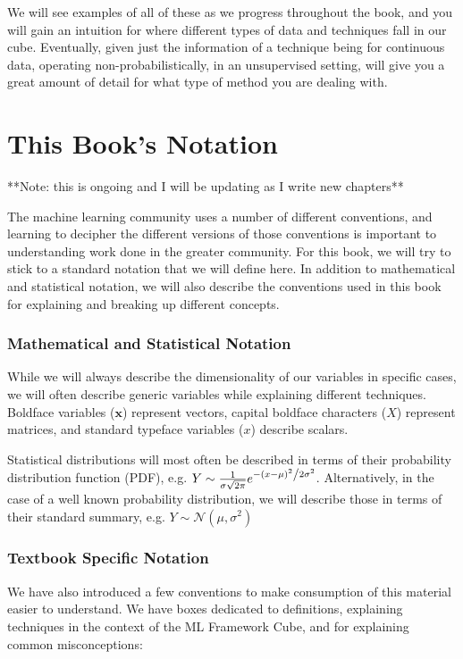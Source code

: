 We will see examples of all of these as we progress throughout the book, and you will gain an intuition for where different types of data and techniques fall in our cube. Eventually, given just the information of a technique being for continuous data, operating non-probabilistically, in an unsupervised setting, will give you a great amount of detail for what type of method you are dealing with.

\section{This Book's Notation}
**Note: this is ongoing and I will be updating as I write new chapters**

The machine learning community uses a number of different conventions, and learning to decipher the different versions of those conventions is important to understanding work done in the greater community. For this book, we will try to stick to a standard notation that we will define here. In addition to mathematical and statistical notation, we will also describe the conventions used in this book for explaining and breaking up different concepts.

\subsubsection{Mathematical and Statistical Notation}
While we will always describe the dimensionality of our variables in specific cases, we will often describe generic variables while explaining different techniques. Boldface variables ($\textbf{x}$) represent vectors, capital boldface characters ($X$) represent matrices, and standard typeface variables ($x$) describe scalars.

Statistical distributions will most often be described in terms of their probability distribution function (PDF), e.g. $Y \sim \frac{1}{{\sigma \sqrt {2\pi } }}e^{{{ - \left( {x - \mu } \right)^2 } \mathord{\left/ {\vphantom {{ - \left( {y - \mu } \right)^2 } {2\sigma ^2 }}} \right. \kern-\nulldelimiterspace} {2\sigma ^2 }}}$. Alternatively, in the case of a well known probability distribution, we will describe those in terms of their standard summary, e.g. $Y \sim \mathcal{N}(\mu, \sigma^2)$

\subsubsection{Textbook Specific Notation}
We have also introduced a few conventions to make consumption of this material easier to understand. We have boxes dedicated to definitions, explaining techniques in the context of the ML Framework Cube, and for explaining common misconceptions: \newline


